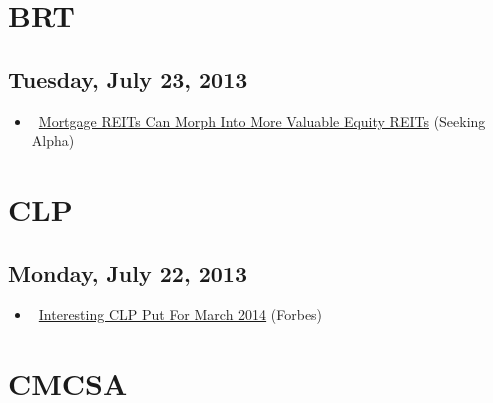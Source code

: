 \documentclass[11pt,asymmetric]{article}
\begin{document}
\section*{BRT}

\subsection*{Tuesday, July 23, 2013}
\begin{itemize}
\item\ \href{http://seekingalpha.com/article/1564992-mortgage-reits-can-morph-into-more-valuable-equity-reits?source=yahoo}{Mortgage REITs Can Morph Into More Valuable Equity REITs} (Seeking Alpha)
\end{itemize}

\section*{CLP}

\subsection*{Monday, July 22, 2013}
\begin{itemize}
\item\ \href{http://www.forbes.com/sites/stockoptionschannel/2013/07/22/interesting-clp-put-for-march-2014/?partner=yahootix}{Interesting CLP Put For March 2014} (Forbes)
\end{itemize}

\section*{CMCSA}
\end{document}
